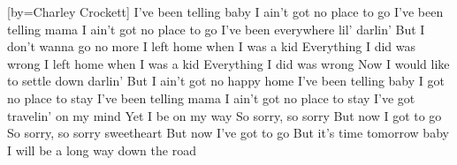 [by={Charley Crockett}]
  \beginverse
  I've been telling baby
  I ain't got no place to go
  I've been telling mama
  I ain't got no place to go
  I've been everywhere lil' darlin'
  But I don't wanna go no more
  \endverse
  \beginverse  
  I left home when I was a kid
  Everything I did was wrong
  I left home when I was a kid
  Everything I did was wrong
  Now I would like to settle down darlin'
  But I ain't got no happy home
  \endverse
  \beginverse  
  I've been telling baby
  I got no place to stay
  I've been telling mama
  I ain't got no place to stay
  I've got travelin' on my mind
  Yet I be on my way
  \endverse
  \beginverse  
  So sorry, so sorry
  But now I got to go
  So sorry, so sorry sweetheart
  But now I've got to go
  But it's time tomorrow baby
  I will be a long way down the road  
  \endverse
\endsong

